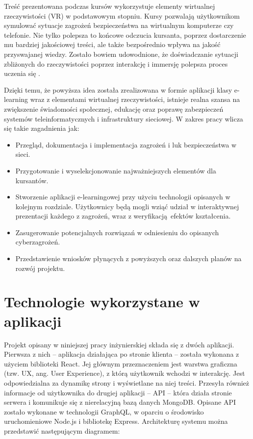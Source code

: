 \documentclass[12pt,twoside]{article}
\begin{document}
Treść prezentowana podczas kursów wykorzystuje elementy wirtualnej rzeczywistości (VR) w podstawowym stopniu. Kursy pozwalają użytkownikom symulować sytuacje zagrożeń bezpieczeństwa na wirtualnym komputerze czy telefonie. Nie tylko polepsza to końcowe odczucia kursanta, poprzez dostarczenie mu bardziej jakościowej treści, ale także bezpośrednio wpływa na jakość przyswajanej wiedzy. Zostało bowiem udowodnione, że doświadczanie sytuacji zbliżonych do rzeczywistości poprzez interakcję i immersję polepsza proces uczenia się \cite{VrLearning}. 

Dzięki temu, że powyższa idea została zrealizowana w formie aplikacji klasy e-learning wraz z elementami wirtualnej rzeczywistości, istnieje realna szansa na zwiększenie świadomości społecznej, edukację oraz poprawę zabezpieczeń systemów teleinformatycznych i infrastruktury sieciowej. W zakres pracy wlicza się takie zagadnienia jak:
\begin{itemize}
\item Przegląd, dokumentacja i implementacja zagrożeń i luk bezpieczeństwa w sieci. 
\item Przygotowanie i wyselekcjonowanie najważniejszych elementów dla kursantów.
\item Stworzenie aplikacji e-learningowej przy użyciu technologii opisanych w kolejnym rozdziale. Użytkownicy będą mogli wziąć udział w interaktywnej prezentacji każdego z zagrożeń, wraz z weryfikacją efektów kształcenia.
\item Zasugerowanie potencjalnych rozwiązań w odniesieniu do opisanych cyberzagrożeń.
\item Przedstawienie wniosków płynących z powyższych oraz dalszych planów na rozwój projektu.\\
\end{itemize} 

\clearpage

\section{Technologie wykorzystane w aplikacji}

Projekt opisany w niniejszej pracy inżynierskiej składa się z dwóch aplikacji. Pierwsza z nich -- aplikacja działająca po stronie klienta -- została wykonana z użyciem biblioteki React. Jej głównym przeznaczeniem jest warstwa graficzna (tzw. UX, ang. User Experience), z którą użytkownik wchodzi w interakcję. Jest odpowiedzialna za dynamikę strony i wyświetlane na niej treści. Przesyła również informacje od użytkownika do drugiej aplikacji -- API -- która działa stronie serwera i komunikuje się z nierelacyjną bazą danych MongoDB. Opisane API zostało wykonane w technologii GraphQL, w oparciu o środowisko uruchomieniowe Node.js i bibliotekę Express. Architekturę systemu można przedstawić następującym diagramem:
\end{document}
